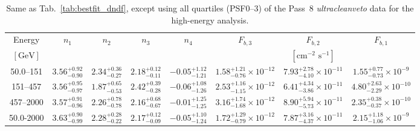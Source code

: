 \begin{table}[hpbt]
\renewcommand{\arraystretch}{1.4}
\setlength{\tabcolsep}{3pt}
\begin{center}
\begin{tabular}{ c  | c  c  c c |  c c c   }
 Energy & $n_1$ & $n_2$ & $n_3$ & $n_4$ & $F_{b,3}$ & $F_{b,2}$ & $F_{b,1}$   \\
$[\text{GeV}]$ &  & & & & \multicolumn{3}{c}{$\left[\text{cm}^{-2}\text{ s}^{-1}\right]$}    \\
\hline
50.0--151 &  
$3.56_{-0.90}^{+0.92}$ & $2.34_{-0.27}^{+0.36}$ & $2.18_{-0.11}^{+0.12}$ & $-0.05_{-1.21}^{+1.12}$ & $1.58_{-0.76}^{+1.21} \times 10^{-12}$ & $7.93_{-4.10}^{+2.78} \times 10^{-11}$ & $1.55_{-0.73}^{+0.77} \times 10^{-9}$
   \\
151--457 &    
$3.56_{-0.97}^{+0.95}$ & $1.87_{-0.53}^{+0.65}$ & $2.42_{-0.28}^{+0.39}$ & $-0.06_{-1.26}^{+1.08}$ & $2.53_{-1.15}^{+1.16} \times 10^{-12}$ & $6.41_{-3.86}^{+4.34} \times 10^{-11}$ & $4.80_{-2.29}^{+2.63} \times 10^{-10}$
   \\
457--2000  & 
$3.57_{-0.96}^{+0.91}$ & $2.26_{-0.78}^{+0.78}$ & $2.16_{-0.67}^{+0.68}$ & $-0.01_{-1.25}^{+1.25}$ & $3.16_{-1.68}^{+1.74} \times 10^{-12}$ & $8.90_{-5.73}^{+5.94} \times 10^{-11}$ & $2.35_{-0.37}^{+0.38} \times 10^{-10}$
  \\  
50.0-2000  &  
$3.63_{-0.99}^{+0.90}$ & $2.28_{-0.22}^{+0.28}$ & $2.17_{-0.09}^{+0.12}$ & $-0.05_{-1.24}^{+1.10}$ & $1.72_{-0.79}^{+1.29} \times 10^{-12}$ & $7.87_{-4.37}^{+3.16} \times 10^{-11}$ & $2.15_{-1.06}^{+1.18} \times 10^{-9}$
  \\
\end{tabular}
\end{center}
\caption{Same as Tab.~\ref{tab:bestfit_dndf}, except using all quartiles (PSF0--3) of the Pass~8 {\it ultracleanveto} data for the high-energy analysis.  }
\label{tab:bestfit_highE_dnds}
\end{table}

